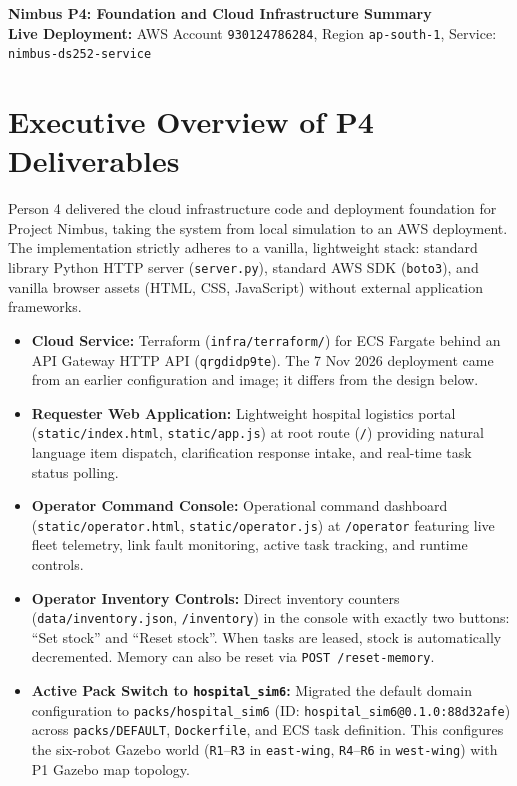 \documentclass[10pt,letterpaper]{article}
\begin{document}
\pagestyle{empty}

\begin{center}
{\Large\textbf{Nimbus P4: Foundation and Cloud Infrastructure Summary}}\\[2pt]
{\small\textbf{Live Deployment:} AWS Account \texttt{930124786284}, Region \texttt{ap-south-1}, Service: \texttt{nimbus-ds252-service}}
\end{center}
\vspace{-6pt}

\section{Executive Overview of P4 Deliverables}
Person 4 delivered the cloud infrastructure code and deployment foundation for Project Nimbus, taking the system from local simulation to an AWS deployment. The implementation strictly adheres to a vanilla, lightweight stack: standard library Python HTTP server (\texttt{server.py}), standard AWS SDK (\texttt{boto3}), and vanilla browser assets (HTML, CSS, JavaScript) without external application frameworks.

\begin{itemize}
  \item \textbf{Cloud Service:} Terraform (\texttt{infra/terraform/}) for ECS Fargate behind an API Gateway HTTP API (\texttt{qrgdidp9te}). The 7 Nov 2026 deployment came from an earlier configuration and image; it differs from the design below.
  \item \textbf{Requester Web Application:} Lightweight hospital logistics portal (\texttt{static/index.html}, \texttt{static/app.js}) at root route (\texttt{/}) providing natural language item dispatch, clarification response intake, and real-time task status polling.
  \item \textbf{Operator Command Console:} Operational command dashboard (\texttt{static/operator.html}, \texttt{static/operator.js}) at \texttt{/operator} featuring live fleet telemetry, link fault monitoring, active task tracking, and runtime controls.
  \item \textbf{Operator Inventory Controls:} Direct inventory counters (\texttt{data/inventory.json}, \texttt{/inventory}) in the console with exactly two buttons: ``Set stock'' and ``Reset stock''. When tasks are leased, stock is automatically decremented. Memory can also be reset via \texttt{POST /reset-memory}.
  \item \textbf{Active Pack Switch to \texttt{hospital\_sim6}:} Migrated the default domain configuration to \texttt{packs/hospital\_sim6} (ID: \texttt{hospital\_sim6@0.1.0:88d32afe}) across \texttt{packs/DEFAULT}, \texttt{Dockerfile}, and ECS task definition. This configures the six-robot Gazebo world (\texttt{R1}--\texttt{R3} in \texttt{east-wing}, \texttt{R4}--\texttt{R6} in \texttt{west-wing}) with P1 Gazebo map topology.
\end{itemize}
\end{document}
